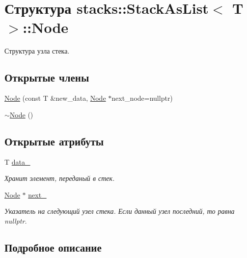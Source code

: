 \hypertarget{structstacks_1_1_stack_as_list_1_1_node}{}\section{Структура stacks\+:\+:Stack\+As\+List$<$ T $>$\+:\+:Node}
\label{structstacks_1_1_stack_as_list_1_1_node}


Структура узла стека.  


\subsection*{Открытые члены}
\begin{DoxyCompactItemize}
\item 
\hyperlink{structstacks_1_1_stack_as_list_1_1_node_ad61cfb928b1f9a6c8d8a3d77982826c8}{Node} (const T \&new\+\_\+data, \hyperlink{structstacks_1_1_stack_as_list_1_1_node}{Node} $\ast$next\+\_\+node=nullptr)
\item 
\hyperlink{structstacks_1_1_stack_as_list_1_1_node_a34fa2b48f60262c41d17caabba4dccf5}{$\sim$\+Node} ()
\end{DoxyCompactItemize}
\subsection*{Открытые атрибуты}
\begin{DoxyCompactItemize}
\item 
T \hyperlink{structstacks_1_1_stack_as_list_1_1_node_a088b1a89491b40c68e329991d1a13192}{data\+\_\+}
\begin{DoxyCompactList}\small\item\em Хранит элемент, переданый в стек. \end{DoxyCompactList}\item 
\hyperlink{structstacks_1_1_stack_as_list_1_1_node}{Node} $\ast$ \hyperlink{structstacks_1_1_stack_as_list_1_1_node_a8b46e2b77445e68cdc3e5a91156567a9}{next\+\_\+}
\begin{DoxyCompactList}\small\item\em Указатель на следующий узел стека. Если данный узел последний, то равна nullptr. \end{DoxyCompactList}\end{DoxyCompactItemize}


\subsection{Подробное описание}
